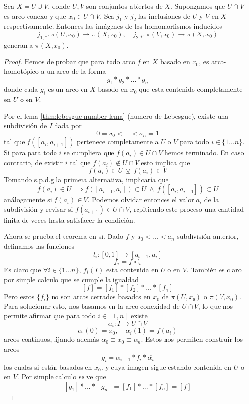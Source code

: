 \begin{teorema} \label{thm:vank-especifico}
  Sea \(X = U \cup V\), donde \(U,V\) son conjuntos abiertos de \(X\).
  Supongamos que \(U \cap V\) es arco-conexo y que \(x_0 \in U \cap V\).
  Sea \(j_1\) y \(j_2\) las inclusiones de \(U\) y \(V\) en \(X\)
  respectivamente. Entonces las imágenes de los homomorfismos inducidos
  \[ j_{1,*} : \pi (U, x_0) \to \pi (X, x_0), \quad j_{2,*} : \pi
  (V, x_0) \to \pi (X, x_0) \]
  generan a \(\pi (X,x_0)\).
\end{teorema}
\begin{proof}
  Hemos de probar que para todo arco \(f\) en \(X\) basado en \(x_0\),
  es arco-homotópico a un arco de la forma
  \[ g_1 * g_2 * ... * g_n \]
  donde cada \(g_i\) es un arco en \(X\) basado en \(x_0\) que esta
  contenido completamente en \(U\) o en \(V\).

  Por el lema \ref{thm:lebesgue-number-lema} (numero de Lebesgue),
  existe una subdivisión de \(I\) dada por
  \[ 0 = a_0 < ... < a_n = 1\]
  tal que
  \(f ([a_i , a_{i+1}])\) pertenece completamente a \(U\) o \(V\) para
  todo \(i \in \{1 \dotsc n\}\). Si para para todo \(i\) se cumpliera que
  \(f(a_i) \in U \cap V\) hemos terminado. En caso contrario, de existir
  \(i\) tal que \(f(a_i) \not \in U \cap V\) esto implica que
  \[ f(a_i) \in U \ \veebar \ f(a_i) \in V \]
  Tomando s.p.d.g la primera alternativa, implicaría que
  \[ f(a_i) \in U \implies f([a_{i-1}, a_{i}]) \subset U \ \land \ f([a_i,
    a_{i+1}]) \subset U \]
  análogamente si \(f(a_i) \in V\). Podemos olvidar entonces el valor
  \(a_i\) de la subdivisión y revisar si \(f(a_{i+1}) \in U \cap V\),
  repitiendo este proceso una cantidad finita de veces hasta satisfacer
  la condición.

  Ahora se prueba el teorema en si. Dado \(f\) y \(a_0 < ... < a_n\)
  subdivisión anterior, definamos las funciones
  \[ l_i : [0,1] \to [a_{i-1}, a_{i}] \]
  \[ f_i = f \circ l_i \]
  Es claro que \(\forall i \in \{1 \dotsc n\}, \ f_i (I) \) esta contenida en
  \(U\) o en \(V\). También es claro por simple calculo que se cumple
  la igualdad
  \[ [f] = [f_1] * [f_2] * ... * [f_n] \]
  Pero estos \(\{f_i\}\) no son arcos cerrados basados en \(x_0\) de
  \(\pi (U,x_0)\) o \(\pi (V,x_0)\). Para solucionar esto, nos basamos
  en la arco conexidad de \(U \cap V\), lo que nos permite afirmar que
  para todo \(i \in [1 , n]\) existe
  \[ \alpha_i : I \to U \cap V \]
  \[ \alpha_i (0) = x_0, \quad \alpha_i (1) = f(a_i) \]
  arcos continuos, fijando además \(\alpha_0 \equiv x_0 \equiv \alpha_n
  \). Estos nos permiten construir los arcos
  \[ g_i = \alpha_{i-1} * f_i * \overline{\alpha_i} \]
  los cuales si están basados en \(x_0\), y cuya imagen sigue estando
  contenida en \(U\) o en \(V\). Por simple calculo se ve que
  \[ [g_1] * ... * [g_n] = [f_1] * ... * [f_n] = [f] \]
\end{proof}
